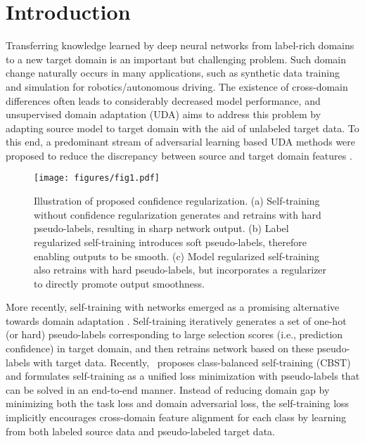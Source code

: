 \documentclass[10pt,twocolumn,letterpaper]{article}
\theoremstyle{plain}
\begin{document}
\section{Introduction}\label{sec:intro}
Transferring knowledge learned by deep neural networks from label-rich domains to a new target domain is an important but challenging problem. Such domain change naturally occurs in many applications, such as synthetic data training~\cite{peng2018visda,richter2016playing} and simulation for robotics/autonomous driving. The existence of cross-domain differences often leads to considerably decreased model performance, and unsupervised domain adaptation (UDA) aims to address this problem by adapting source model to target domain with the aid of unlabeled target data. To this end, a predominant stream of adversarial learning based UDA methods were proposed to reduce the discrepancy between source and target domain features
\cite{chen2018domain,chen2017no,hoffman2018cycada,kim2019unsupervised,long2018conditional,murez2018image,pinheiro2018unsupervised,saito2018adversarial,sankaranarayanan2018generate,Tsai_adaptseg_2018}.
\begin{figure}[!t]
\texttt{[image: figures/fig1.pdf]}
\caption{Illustration of proposed confidence regularization. (a) Self-training without confidence regularization generates and retrains with hard pseudo-labels, resulting in sharp network output. (b) Label regularized self-training introduces soft pseudo-labels, therefore enabling outputs to be smooth. (c) Model regularized self-training also retrains with hard pseudo-labels, but incorporates a regularizer to directly promote output smoothness.}\label{fig:teaser}
\vspace{-2mm}
\end{figure}

More recently, self-training with networks emerged as a promising alternative towards domain adaptation \cite{busto2018open, Chen_2019_CVPR,inoue2018cross, lee2013pseudo, saito2017asymmetric, shu2018dirt, Zou_2018_ECCV}. Self-training iteratively generates a set of one-hot (or hard) pseudo-labels corresponding to large selection scores (i.e., prediction confidence) in target domain, and then retrains network based on these pseudo-labels with target data. Recently,~\cite{Zou_2018_ECCV} proposes class-balanced self-training (CBST) and formulates self-training as a unified loss minimization with pseudo-labels that can be solved in an end-to-end manner. Instead of reducing domain gap by minimizing both the task loss and domain adversarial loss, the self-training loss implicitly encourages cross-domain feature alignment for each class by learning from both labeled source data and pseudo-labeled target data.
\end{document}
